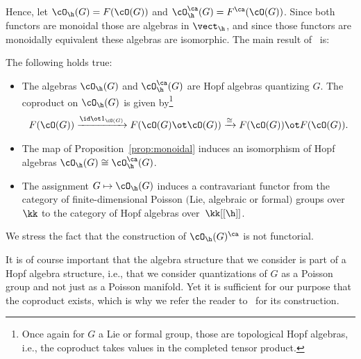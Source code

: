 Hence, let $\cO_\h(G)=F(\cO(G))$ and $\cO^\ca_\h(G)=F^\ca(\cO(G))$. Since both functors are monoidal those are algebras in $\vect_\h$, and since those functors are monoidally equivalent these algebras are isomorphic. The main result of~\cite{Etingof1996, Severa2016} is:
\begin{thm}\label{thm:EK}The following holds true:
	\begin{itemize}\itemsep=0pt
		\item The algebras $\cO_\h(G)$ and $\cO^\ca_\h(G)$ are Hopf algebras quantizing $G$. The coproduct on $\cO_\h(G)$ is given by\footnote{Once again for $G$ a Lie or formal group, those are topological Hopf algebras, i.e., the coproduct takes values in the completed tensor product.}
			\begin{gather*}
				F(\cO(G))\xrightarrow{\id\ot 1_{\cO(G)}} F(\cO(G)\ot \cO(G))\xrightarrow{\cong} F(\cO(G))\ot F(\cO(G)).
				\end{gather*}
		\item The map of Proposition~{\rm \ref{prop:monoidal}} induces an isomorphism of Hopf algebras $\cO_\h(G)\cong \cO_\h^\ca(G)$.
		\item The assignment $G \mapsto \cO_\h(G)$ induces a contravariant functor from the category of finite-dimensional Poisson $($Lie, algebraic or formal$)$ groups over $\kk$ to the category of Hopf algebras over~$\kk[[\h]]$.
	\end{itemize}
\end{thm}
\begin{rmk}
	We stress the fact that the construction of $\cO_\h(G)^\ca$ is not functorial.
\end{rmk}
\begin{rmk}
It is of course important that the algebra structure that we consider is part of a Hopf algebra structure, i.e., that we consider quantizations of $G$ as a Poisson group and not just as a Poisson manifold. Yet it is suf\/f\/icient for our purpose that the coproduct exists, which is why we refer the reader to~\cite{Etingof1996, Severa2016} for its construction.
\end{rmk}
